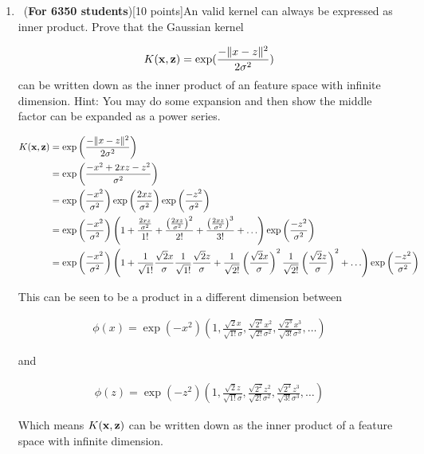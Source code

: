 \begin{enumerate}
 \item ~(\textbf{For 6350 students})[10 points]An valid kernel can always be  expressed as inner product. Prove that the Gaussian  kernel

$$K({\bf x}, {\bf z}) = \exp(\frac{-\| x -z\|^2}{2 \sigma^2})$$
 can be written down as the inner product of an feature space with infinite dimension. Hint:  You may do some expansion and  then show the middle factor can be expanded as a power series.
 
   \begin{equation*}
\begin{aligned}
  K({\bf x}, {\bf z}) &= \exp\left(\frac{-\| x -z\|^2}{2 \sigma^2}\right)\\
  &= \exp\left(\frac{-x^2 + 2xz -z^2}{\sigma^2}\right)\\
  &= \exp\left(\frac{-x^2}{\sigma^2}\right) \exp\left(\frac{2xz}{\sigma^2}\right) \exp\left(\frac{-z^2}{\sigma^2}\right)\\
  &= \exp\left(\frac{-x^2}{\sigma^2}\right) \left(1+ \frac{\frac{2xz}{\sigma^2}}{1!}  + \frac{\left(\frac{2xz}{\sigma^2}\right)^2}{2!} + \frac{\left(\frac{2xz}{\sigma^2}\right)^3}{3!}+ \ldots \right) \exp\left(\frac{-z^2}{\sigma^2}\right)\\
  &= \exp\left(\frac{-x^2}{\sigma^2}\right) \left(1+ \frac{1}{\sqrt{1!}}\frac{\sqrt{2}x}{\sigma } \frac{1}{\sqrt{1!}}\frac{\sqrt{2}z}{\sigma } +  \frac{1}{\sqrt{2!}}\left(\frac{\sqrt{2}x}{\sigma }\right)^2 \frac{1}{\sqrt{2!}}\left(\frac{\sqrt{2}z}{\sigma } \right)^2+  \ldots \right) \exp\left(\frac{-z^2}{\sigma^2}\right)\\
\end{aligned}
\end{equation*}

This can be seen to be a product in a different dimension between

   \begin{equation*}
\begin{aligned}
\phi(x) = \exp(-x^2) \left(1, \frac{\sqrt{2}x}{\sqrt{1!}\sigma}, \frac{\sqrt{2^2}x^2}{\sqrt{2!}\sigma^2} , \frac{\sqrt{2^3}x^3}{\sqrt{3!}\sigma^3} , \ldots\right)
\end{aligned}
\end{equation*}
 
 and 
 
   \begin{equation*}
\begin{aligned}
\phi(z) = \exp(-z^2) \left(1, \frac{\sqrt{2}z}{\sqrt{1!}\sigma}, \frac{\sqrt{2^2}z^2}{\sqrt{2!}\sigma^2} , \frac{\sqrt{2^3}z^3}{\sqrt{3!}\sigma^3} , \ldots\right)
\end{aligned}
\end{equation*}
 
 Which means $K({\bf x}, {\bf z})$ can be written down as the inner product of a feature space with infinite dimension. 
\end{enumerate}

